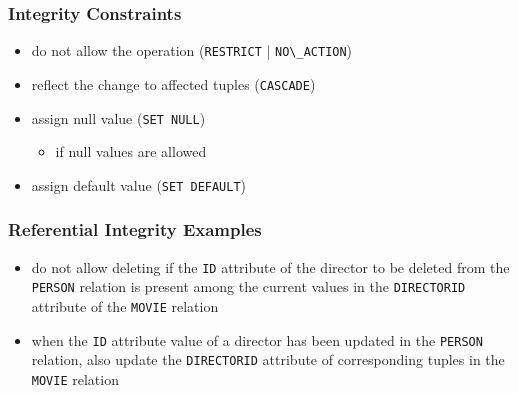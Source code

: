 \documentclass[dvipsnames]{beamer}
\theoremstyle{plain}
\begin{document}
\begin{frame}
  \frametitle{Integrity Constraints}

  \begin{itemize}
    \item do not allow the operation
      (\lstinline!RESTRICT! | \lstinline!NO\_ACTION!)

    \pause
    \item reflect the change to affected tuples (\lstinline!CASCADE!)

    \pause
    \item assign null value (\lstinline!SET NULL!)
    \begin{itemize}
      \item if null values are allowed
    \end{itemize}

    \pause
    \item assign default value (\lstinline!SET DEFAULT!)
  \end{itemize}
\end{frame}

\begin{frame}[fragile]
  \frametitle{Referential Integrity Examples}

  \begin{example}
    \begin{itemize}
      \item do not allow deleting if the \texttt{ID} attribute of the director
        to be deleted from the \texttt{PERSON} relation is present among the
        current values in the \texttt{DIRECTORID} attribute of the
        \texttt{MOVIE} relation
    \end{itemize}
  \end{example}

  \pause
  \begin{example}
    \begin{itemize}
      \item when the \texttt{ID} attribute value of a director has been
        updated in the \texttt{PERSON} relation, also update the
        \texttt{DIRECTORID} attribute of corresponding tuples in the
        \texttt{MOVIE} relation
    \end{itemize}
  \end{example}
\end{frame}
\end{document}
